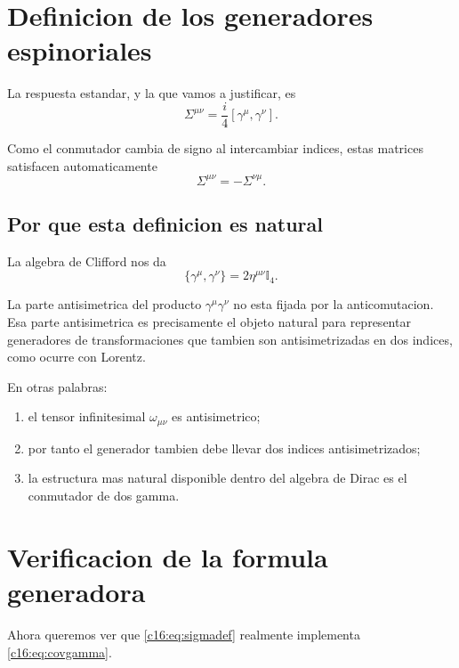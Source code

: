 \section{Definicion de los generadores espinoriales}
La respuesta estandar, y la que vamos a justificar, es
\begin{equation}
\boxed{
\Sigma^{\mu\nu}=\frac{i}{4}[\gamma^\mu,\gamma^\nu].
}
\label{c16:eq:sigmadef}
\end{equation}

Como el conmutador cambia de signo al intercambiar indices, estas matrices satisfacen automaticamente
\begin{equation}
\Sigma^{\mu\nu}=-\Sigma^{\nu\mu}.
\end{equation}

\subsection{Por que esta definicion es natural}
La algebra de Clifford nos da
\begin{equation}
\{\gamma^\mu,\gamma^\nu\}=2\eta^{\mu\nu}\mathbb{I}_4.
\label{c16:eq:cliff}
\end{equation}

La parte antisimetrica del producto $\gamma^\mu\gamma^\nu$ no esta fijada por la anticomutacion. Esa parte antisimetrica es precisamente el objeto natural para representar generadores de transformaciones que tambien son antisimetrizadas en dos indices, como ocurre con Lorentz.

En otras palabras:
\begin{enumerate}[label=\arabic*.]
    \item el tensor infinitesimal $\omega_{\mu\nu}$ es antisimetrico;
    \item por tanto el generador tambien debe llevar dos indices antisimetrizados;
    \item la estructura mas natural disponible dentro del algebra de Dirac es el conmutador de dos gamma.
\end{enumerate}

\section{Verificacion de la formula generadora}
Ahora queremos ver que \eqref{c16:eq:sigmadef} realmente implementa \eqref{c16:eq:covgamma}.

